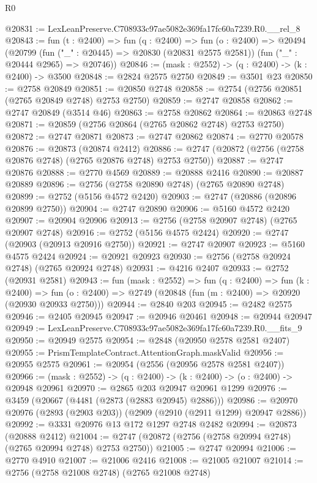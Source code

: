 \begin{lexlean}{R0}
\begin{coremodule}
@20831 := LexLeanPreserve.C708933c97ae5082e369fa17fc60a7239.R0.__rel_8
@20843 := fun (t : @2400) =>
  fun (q : @2400) =>
  fun (o : @2400) =>
  @20494
    (@20799
      (fun ("_" : @20445) => @20830 (@20831 @2575 @2581))
      (fun ("_" : @20444 @2965) => @20746))
@20846 := (mask : @2552) -> (q : @2400) -> (k : @2400) -> @3500
@20848 := @2824 @2575 @2750
@20849 := @3501 @23
@20850 := @2758 @20849
@20851 := @20850 @2748
@20858 := @2754 (@2756 @20851 (@2765 @20849 @2748) @2753 @2750)
@20859 := @2747 @20858
@20862 := @2747 @20849 (@3514 @46)
@20863 := @2758 @20862
@20864 := @20863 @2748
@20871 := @20859 (@2756 @20864 (@2765 @20862 @2748) @2753 @2750)
@20872 := @2747 @20871
@20873 := @2747 @20862
@20874 := @2770 @20578
@20876 := @20873 (@20874 @2412)
@20886 := @2747 (@20872 (@2756 (@2758 @20876 @2748) (@2765 @20876 @2748) @2753 @2750))
@20887 := @2747 @20876
@20888 := @2770 @4569
@20889 := @20888 @2416
@20890 := @20887 @20889
@20896 := @2756 (@2758 @20890 @2748) (@2765 @20890 @2748)
@20899 := @2752 (@5156 @4572 @2420)
@20903 := @2747 (@20886 (@20896 @20899 @2750))
@20904 := @2747 @20890
@20906 := @5160 @4572 @2420
@20907 := @20904 @20906
@20913 := @2756 (@2758 @20907 @2748) (@2765 @20907 @2748)
@20916 := @2752 (@5156 @4575 @2424)
@20920 := @2747 (@20903 (@20913 @20916 @2750))
@20921 := @2747 @20907
@20923 := @5160 @4575 @2424
@20924 := @20921 @20923
@20930 := @2756 (@2758 @20924 @2748) (@2765 @20924 @2748)
@20931 := @4216 @2407
@20933 := @2752 (@20931 @2581)
@20943 := fun (mask : @2552) =>
  fun (q : @2400) =>
  fun (k : @2400) =>
  fun (o : @2400) => @2749 (@20848 (fun (m : @2400) => @20920 (@20930 @20933 @2750)))
@20944 := @2840 @203
@20945 := @2482 @2575
@20946 := @2405 @20945
@20947 := @20946 @20461
@20948 := @20944 @20947
@20949 := LexLeanPreserve.C708933c97ae5082e369fa17fc60a7239.R0.__fits_9
@20950 := @20949 @2575
@20954 := @2848 (@20950 @2578 @2581 @2407)
@20955 := PrismTemplateContract.AttentionGraph.maskValid
@20956 := @20955 @2575
@20961 := @20954 (@2556 (@20956 @2578 @2581 @2407))
@20966 := (mask : @2552) -> (q : @2400) -> (k : @2400) -> (o : @2400) -> @20948 @20961
@20970 := @2865 @203 @20947 @20961 @1299
@20976 := @3459 (@20667 (@4481 (@2873 (@2883 @20945) @2886)))
@20986 := @20970 @20976 (@2893 (@2903 @203)) (@2909 (@2910 (@2911 @1299) @20947 @2886))
@20992 := @3331 @20976 @13 @172 @1297 @2748 @2482
@20994 := @20873 (@20888 @2412)
@21004 := @2747 (@20872 (@2756 (@2758 @20994 @2748) (@2765 @20994 @2748) @2753 @2750))
@21005 := @2747 @20994
@21006 := @2770 @4910
@21007 := @21006 @2416
@21008 := @21005 @21007
@21014 := @2756 (@2758 @21008 @2748) (@2765 @21008 @2748)

\end{coremodule}
\end{lexlean}

